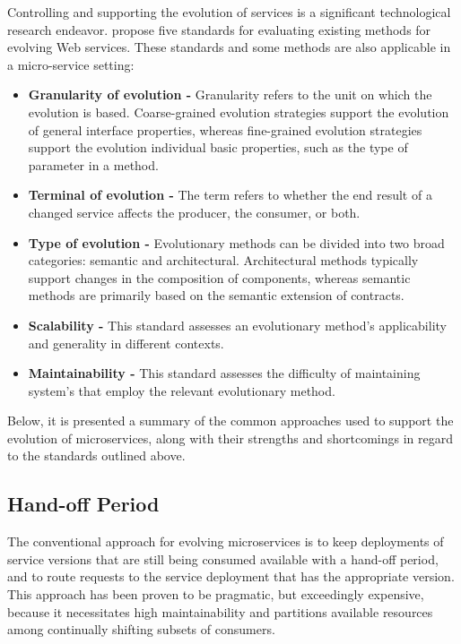 Controlling and supporting the evolution of services is a significant technological research endeavor.
\citeauthor{webServiceEvolution} \cite{webServiceEvolution} propose five standards for evaluating existing methods for evolving Web services.
These standards and some methods are also applicable in a micro-service setting:

\begin{itemize}
    \item \textbf{Granularity of evolution -} Granularity refers to the unit on which the evolution is based.
    Coarse-grained evolution strategies support the evolution of general interface properties,
    whereas fine-grained evolution strategies support the evolution individual basic properties, such as the type of parameter in a method.
    \item \textbf{Terminal of evolution -} The term refers to whether the end result of a changed service affects the producer, the consumer, or both.
    \item \textbf{Type of evolution -} Evolutionary methods can be divided into two broad categories: semantic and architectural.
    Architectural methods typically support changes in the composition of components, whereas semantic methods are primarily based on the semantic extension of contracts.
    \item \textbf{Scalability -} This standard assesses an evolutionary method's applicability and generality in different contexts.
    \item \textbf{Maintainability -} This standard assesses the difficulty of maintaining system's that employ the relevant evolutionary method.
\end{itemize}

Below, it is presented a summary of the common approaches used to support the evolution of microservices,
along with their strengths and shortcomings in regard to the standards outlined above.

\subsection{Hand-off Period} %
\label{sec:hand_off_period}

The conventional approach for evolving microservices is to keep deployments of service versions that are still being consumed available with a hand-off period,
and to route requests to the service deployment that has the appropriate version.
This approach has been proven to be pragmatic, but exceedingly expensive,
because it necessitates high maintainability and partitions available resources among continually shifting subsets of consumers.

